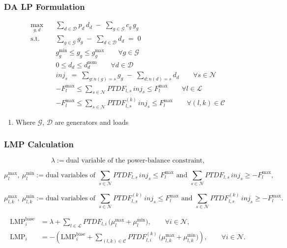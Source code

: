 \documentclass[
    11pt,
]{beamer}
\begin{document}
\begin{frame}
    \frametitle{DA LP Formulation}
    \footnotesize

    \begin{align*}
        \max_{g,d}\quad
        & \sum_{d\in\mathcal D} p_d\, d_d \;-\; \sum_{g\in\mathcal G} c_g\, g_g \\[6pt]
        \text{s.t.}\quad
        & \sum_{g\in\mathcal G} g_g \;-\; \sum_{d\in\mathcal D} d_d \;=\; 0 \\[6pt]
        & g_g^{\min} \le g_g \le g_g^{\max}
        \qquad \forall g\in\mathcal G \\[6pt]
        & 0 \le d_d \le d_d^{\text{nom}}
        \qquad \forall d\in\mathcal D \\[6pt]
        & inj_s \;=\;
        \sum_{g:n(g)=s} g_g
        \;-\;
        \sum_{d:n(d)=s} d_d
        \qquad \forall s\in\mathcal N \\[6pt]
        & -F_l^{\max}
        \le
        \sum_{s\in\mathcal N} PTDF_{l,s}\,inj_s
        \le
        F_l^{\max}
        \qquad \forall l\in\mathcal L \\[6pt]
        & -F_l^{\max}
        \le
        \sum_{s\in\mathcal N} PTDF^{(k)}_{l,s}\,inj_s
        \le
        F_l^{\max}
        \qquad \forall (l,k)\in\mathcal C
\end{align*}

\begin{enumerate}
    \item Where $\mathcal G$, $\mathcal D$ are generators and loads
\end{enumerate}

\end{frame}

\begin{frame}
    \frametitle{LMP Calculation}
    \footnotesize
   
   \[
        \lambda
        := \text{dual variable of the power-balance constraint,}
        \]

        \[
        \mu_l^{\max},\ \mu_l^{\min}
        := \text{dual variables of }
        \sum_{s\in\mathcal N} PTDF_{l,s}\,inj_s \le F_l^{\max}
        \text{ and }
        \sum_{s\in\mathcal N} PTDF_{l,s}\,inj_s \ge -F_l^{\max},
        \]

        \[
        \mu_{l,k}^{\max},\ \mu_{l,k}^{\min}
        := \text{dual variables of }
        \sum_{s\in\mathcal N} PTDF^{(k)}_{l,s}\,inj_s \le F_l^{\max}
        \text{ and }
        \sum_{s\in\mathcal N} PTDF^{(k)}_{l,s}\,inj_s \ge -F_l^{\max}.
        \]

    \begin{align*}
        \mathrm{LMP}_i^{\text{base}}
        &=
        \lambda
        +
        \sum_{l\in\mathcal L}
        PTDF_{l,i}\,
        \bigl(\mu_l^{\max}+\mu_l^{\min}\bigr),
        \qquad \forall i\in\mathcal N, \\[6pt]
        \mathrm{LMP}_i
        &=
        -\left(
        \mathrm{LMP}_i^{\text{base}}
        +
        \sum_{(l,k)\in\mathcal C}
        PTDF^{(k)}_{l,i}\,
        \bigl(\mu_{l,k}^{\max}+\mu_{l,k}^{\min}\bigr)
        \right),
        \qquad \forall i\in\mathcal N.
    \end{align*}
\end{frame}
\end{document}
